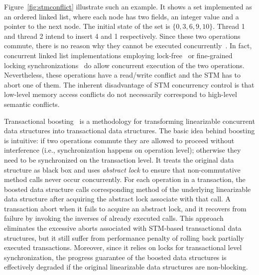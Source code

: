 \documentclass[10pt,conference,compsocconf]{IEEEtran}
\begin{document}
Figure~\ref{fig:stmconflict} illustrate such an example.
It shows a set implemented as an ordered linked list, where each node has two fields, an integer value and a pointer to the next node.
The initial state of the set is $\{0,3,6,9,10\}$.
Thread 1 and thread 2 intend to insert 4 and 1 respectively.
Since these two operations commute, there is no reason why they cannot be executed concurrently~\cite{clements2015scalable}.
In fact, concurrent linked list implementations employing lock-free~\cite{michael2002high} or fine-grained locking synchronizations~\cite{bayer1977concurrency} do allow concurrent execution of the two operations.
Nevertheless, these operations have a read/write conflict and the STM has to abort one of them. 
The inherent disadvantage of STM concurrency control is that low-level memory access conflicts do not necessarily correspond to high-level semantic conflicts.

Transactional boosting~\cite{herlihy2008transactional} is a methodology for transforming linearizable concurrent data structures into transactional data structures.
The basic idea behind boosting is intuitive: if two operations commute they are allowed to proceed without interference (i.e., synchronization happens on operation level); otherwise they need to be synchronized on the transaction level.
It treats the original data structure as black box and uses \emph{abstract lock} to ensure that non-commutative method calls never occur concurrently. 
For each operation in a transaction, the boosted data structure calls corresponding method of the underlying linearizable data structure after acquiring the abstract lock associate with that call. 
A transaction abort when it fails to acquire an abstract lock, and it recovers from failure by invoking the inverses of already executed calls. 
This approach eliminates the excessive aborts associated with STM-based transactional data structures, but it still suffer from performance penalty of rolling back partially executed transactions.
Moreover, since it relies on locks for transactional level synchronization, the progress guarantee of the boosted data structures is effectively degraded if the original linearizable data structures are non-blocking.
 
\end{document}
